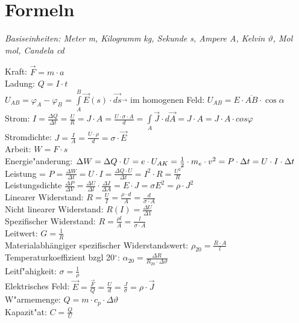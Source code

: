 \section{Formeln}

\textit{Basiseinheiten: Meter m, Kilogramm kg, Sekunde s, Ampere A, Kelvin $\vartheta$, Mol mol, Candela cd} \\
\begin{minipage}{12cm}
	Kraft: $\overrightarrow{F} = m \cdot a$ \\ 
	Ladung: $Q = I \cdot t$\\
	$ U_{AB} = \varphi_A - \varphi_B $ = $\int\limits_{A}^B \vec E (s) \cdot  \vec{ds} \overrightarrow{}$ im homogenen Feld: $U_{AB} = E \cdot \overline{AB} \cdot \cos\alpha $ \\
	Strom: $I = \frac{\Delta Q}{\Delta t} = \frac{U}{R} = J \cdot A = \frac{U \cdot \sigma \cdot A}{d} = \int\limits_{A} \vec J \cdot d\vec A = J \cdot A = J \cdot A \cdot cos \varphi $\\
	Stromdichte: $J=\frac {I}{A} = \frac{U \cdot \rho}{d} = \sigma \cdot \vec E $\\
	Arbeit: $W = F \cdot s$ \\
	Energie"anderung: $\Delta W = \Delta Q \cdot U = e \cdot U_{AK} = \frac{1}{2} \cdot m_{e}  \cdot v^2 = \\ P \cdot \Delta t = U \cdot I \cdot \Delta t$ \\
	Leistung = $P = \frac{\Delta W}{\Delta t}= U \cdot I = \frac{\Delta Q \cdot U}{\Delta t} = I^2 \cdot R = \frac{U^2}{R} $\hspace{10pt}\\
	Leistungsdichte $\frac{\Delta P}{\Delta V} = \frac{\Delta U }{\Delta l} \cdot \frac{\Delta I}{\Delta A} = E \cdot J = \sigma E^2 = \rho \cdot J^2 $\\
	Linearer Widerstand: $R = \frac{U}{I} = \frac{\rho \cdot d}{A} = \frac{d}{\sigma \cdot A} \; $\\
	Nicht linearer Widerstand: $R(I) = \frac{\Delta U}{\Delta 1}$ \\
	Spezifischer Widerstand: $R = \frac{\rho\mathit{l}}{A}=\frac{\mathit{l}}{\sigma \cdot A}$\\
	Leitwert: $G = \frac{1}{R}$ \\
	Materialabhängiger spezifischer Widerstandswert: $\rho_{20} = \frac{R \cdot A}{l} $\\
	Temperaturkoeffizient bzgl 20$^\circ$: $\alpha_{20}=\frac{\Delta R}{ R_{20} \cdot \Delta \vartheta}$ \\
	Leitf"ahigkeit: $\sigma = \frac{1}{\rho}$ \\
	Elektrisches Feld: $\overrightarrow{E} = \frac{\overrightarrow{F}}{Q} = \frac{U}{d} = \frac{J}{\sigma} = \rho \cdot \vec J $\\
	W"armemenge: $Q = m \cdot c_{p} \cdot \Delta\vartheta$ \\
	Kapazit"at: $C = \frac{Q}{U}$

\end{minipage}
